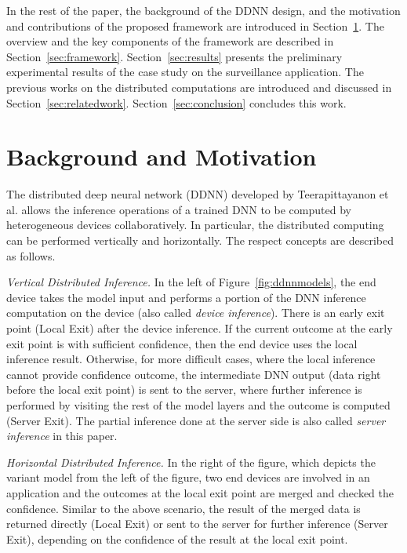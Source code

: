 \documentclass[conference]{IEEEtran}
\def\figurename{Figure}
\def\sectionname{Section}
\begin{document}
In the rest of the paper, the background of the DDNN design, and the motivation and contributions of the proposed framework are introduced in \sectionname~\ref{sec:bk}. The overview and the key components of the framework are described in \sectionname~\ref{sec:framework}. \sectionname~\ref{sec:results} presents the preliminary experimental results of the case study on the surveillance application. The previous works on the distributed computations are introduced and discussed in \sectionname~\ref{sec:relatedwork}. \sectionname~\ref{sec:conclusion} concludes this work.

\section{Background and Motivation}
\label{sec:bk}
The distributed deep neural network (DDNN) developed by Teerapittayanon et al. \cite{Teerapittayanon17} allows the inference operations of a trained DNN to be computed by heterogeneous devices collaboratively. In particular, the distributed computing can be performed vertically and horizontally. The respect concepts are described as follows.

\emph{Vertical Distributed Inference.} In the left of \figurename~\ref{fig:ddnnmodels}, the end device takes the model input and performs a portion of the DNN inference computation on the device (also called \emph{device inference}). There is an early exit point (Local Exit) after the device inference. If the current outcome at the early exit point is with sufficient confidence, then the end device uses the local inference result. Otherwise, for more difficult cases, where the local inference cannot provide confidence outcome, the intermediate DNN output (data right before the local exit point) is sent to the server, where further inference is performed by visiting the rest of the model layers and the outcome is computed (Server Exit). The partial inference done at the server side is also called \emph{server inference} in this paper.

\emph{Horizontal Distributed Inference.} In the right of the figure, which depicts the variant model from the left of the figure, two end devices are involved in an application and the outcomes at the local exit point are merged and checked the confidence. Similar to the above scenario, the result of the merged data is returned directly (Local Exit) or sent to the server for further inference (Server Exit), depending on the confidence of the result at the local exit point.
\end{document}
